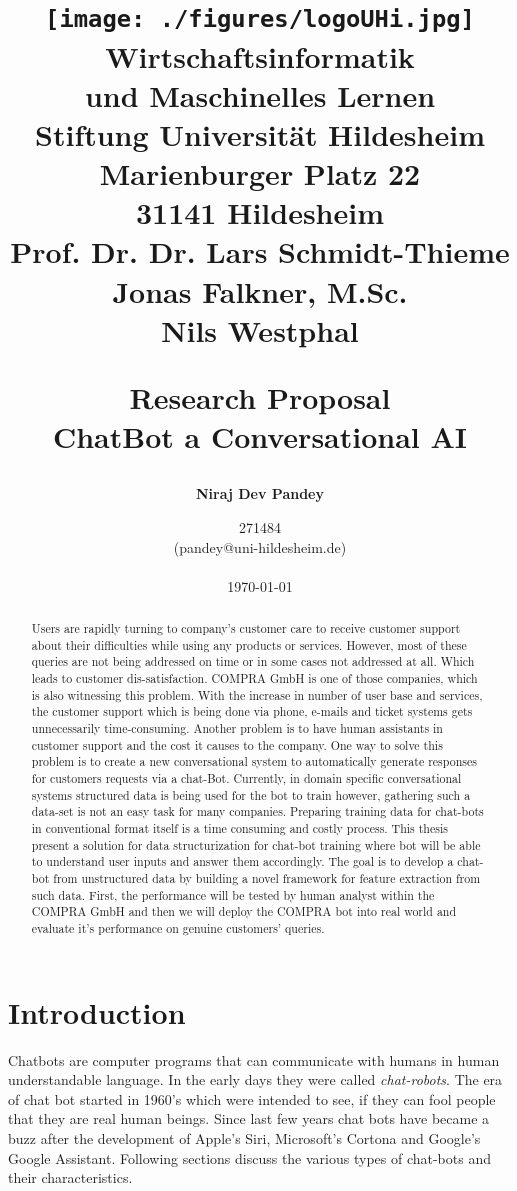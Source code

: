 \documentclass[a4paper,12pt]{article}
\title{
\begin{flushright}
\texttt{[image: ./figures/logoUHi.jpg]}\\
\vspace{0.75cm}
{\small
Wirtschaftsinformatik\\und Maschinelles Lernen\\
Stiftung Universität Hildesheim\\
Marienburger Platz 22\\
31141 Hildesheim\\
Prof. Dr. Dr. Lars Schmidt-Thieme\\
Jonas Falkner, M.Sc.\\
Nils Westphal\\} 
\end{flushright}
\vspace{2cm}
\begin{center}
\textbf{Research Proposal}\\
ChatBot a Conversational AI %
\end{center}
}
\author{\textbf{Niraj Dev Pandey}}
\date{271484 \\ %
(pandey@uni-hildesheim.de) \\  %
\ \\
\today}
\begin{document}
\maketitle
\thispagestyle{empty}

\newpage

\begin{abstract}
Users are rapidly turning to company’s customer care to receive customer support about their difficulties while using any products or services. However, most of these queries are not being addressed on time or in some cases not addressed at all. Which leads to customer dis-satisfaction. COMPRA GmbH is one of those companies, which is also witnessing this problem. With the increase in number of user base and services, the customer support which is being done via phone, e-mails and ticket systems gets unnecessarily time-consuming. Another problem is to have human assistants in customer support and the cost it causes to the company. One way to solve this problem is to create a new conversational system to automatically generate responses for customers requests via a chat-Bot. Currently, in domain specific conversational systems structured data is being used for the bot to train however, gathering such a data-set is not an easy task for many companies. Preparing training data for chat-bots in conventional format itself is a time consuming and costly process. This thesis present a solution for data structurization for chat-bot training where bot will be able to understand user inputs and answer them accordingly. The goal is to develop a chat-bot from unstructured data by building a novel framework for feature extraction from such data. First, the performance will be tested by human analyst within the COMPRA GmbH and then we will deploy the COMPRA bot into real world and evaluate it's performance on genuine customers' queries.
 
\end{abstract}

\newpage

\tableofcontents

\newpage



\section{Introduction}
Chatbots are computer programs that can communicate with humans in human understandable language. In the early days they were called \textit{chat-robots}. The era of chat bot started in 1960's which were intended to see, if they can fool people that they are real human beings. Since last few years chat bots have became a buzz after the development of Apple's Siri, Microsoft's Cortona and Google's Google Assistant. Following sections discuss the various types of chat-bots and their characteristics.
\end{document}
